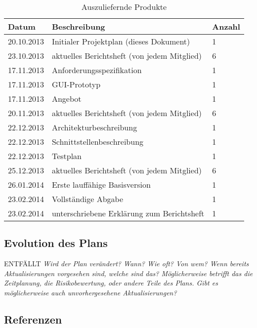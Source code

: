 \documentclass[fontsize=12pt,paper=a4,twoside]{scrartcl}
\begin{document}
\begin{table}[htbp]
\caption{Auszuliefernde Produkte}
\centering
\begin{tabular}{|p{4cm}|p{8cm}|p{2cm}|}
\hline Datum & Beschreibung & Anzahl\\ 
\hline 20.10.2013 & Initialer Projektplan (dieses Dokument) & 1\\
\hline 23.10.2013 & aktuelles Berichtsheft (von jedem Mitglied) & 6\\
\hline 17.11.2013 & Anforderungsspezifikation & 1\\
\hline 17.11.2013 & GUI-Prototyp & 1\\
\hline 17.11.2013 & Angebot & 1\\
\hline 20.11.2013 & aktuelles Berichtsheft (von jedem Mitglied) & 6\\
\hline 22.12.2013 & Architekturbeschreibung & 1\\
\hline 22.12.2013 & Schnittstellenbeschreibung & 1\\
\hline 22.12.2013 & Testplan & 1\\
\hline 25.12.2013 & aktuelles Berichtsheft (von jedem Mitglied) & 6\\
\hline 26.01.2014 & Erste lauffähige Basisversion & 1\\
\hline 23.02.2014 & Vollständige Abgabe & 1\\
\hline 23.02.2014 & unterschriebene Erklärung zum Berichtsheft & 1\\
\hline 
\end{tabular}
\end{table}

\subsection{Evolution des Plans}
ENTFÄLLT
{\em Wird der Plan verändert? Wann? Wie oft? Von wem? Wenn bereits Aktualisierungen vorgesehen sind, welche sind das? Möglicherweise betrifft das die Zeitplanung, die Risikobewertung, oder andere Teile des Plans. Gibt es möglicherweise auch unvorhergesehene Aktualisierungen?}

\subsection{Referenzen}
%
%
%
%
\end{document}
